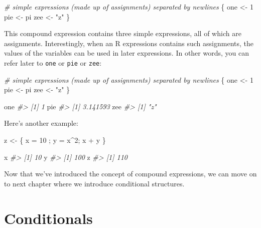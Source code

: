 \documentclass[
]{book}
\newenvironment{Shaded}{\begin{snugshade}}{\end{snugshade}}
\newcommand{\CommentTok}[1]{\textcolor[rgb]{0.56,0.35,0.01}{\textit{#1}}}
\newcommand{\DecValTok}[1]{\textcolor[rgb]{0.00,0.00,0.81}{#1}}
\newcommand{\NormalTok}[1]{#1}
\newcommand{\OtherTok}[1]{\textcolor[rgb]{0.56,0.35,0.01}{#1}}
\newcommand{\SpecialCharTok}[1]{\textcolor[rgb]{0.00,0.00,0.00}{#1}}
\newcommand{\StringTok}[1]{\textcolor[rgb]{0.31,0.60,0.02}{#1}}
\begin{document}
\begin{Shaded}
\begin{Highlighting}[]
\CommentTok{\# simple expressions (made up of assignments) separated by newlines}
\NormalTok{\{}
\NormalTok{  one }\OtherTok{\textless{}{-}} \DecValTok{1}
\NormalTok{  pie }\OtherTok{\textless{}{-}}\NormalTok{ pi}
\NormalTok{  zee }\OtherTok{\textless{}{-}} \StringTok{"z"}
\NormalTok{\}}
\end{Highlighting}
\end{Shaded}

This compound expression contains three simple expressions, all of which are
assignments. Interestingly, when an R expressions contains such assignments, the
values of the variables can be used in later expressions. In other words, you
can refer later to \texttt{one} or \texttt{pie} or \texttt{zee}:

\begin{Shaded}
\begin{Highlighting}[]
\CommentTok{\# simple expressions (made up of assignments) separated by newlines}
\NormalTok{\{}
\NormalTok{  one }\OtherTok{\textless{}{-}} \DecValTok{1}
\NormalTok{  pie }\OtherTok{\textless{}{-}}\NormalTok{ pi}
\NormalTok{  zee }\OtherTok{\textless{}{-}} \StringTok{"z"}
\NormalTok{\}}

\NormalTok{one}
\CommentTok{\#\textgreater{} [1] 1}
\NormalTok{pie}
\CommentTok{\#\textgreater{} [1] 3.141593}
\NormalTok{zee}
\CommentTok{\#\textgreater{} [1] "z"}
\end{Highlighting}
\end{Shaded}

Here's another example:

\begin{Shaded}
\begin{Highlighting}[]
\NormalTok{z }\OtherTok{\textless{}{-}}\NormalTok{ \{ x }\OtherTok{=} \DecValTok{10}\NormalTok{ ; y }\OtherTok{=}\NormalTok{ x}\SpecialCharTok{\^{}}\DecValTok{2}\NormalTok{; x }\SpecialCharTok{+}\NormalTok{ y \}}

\NormalTok{x}
\CommentTok{\#\textgreater{} [1] 10}
\NormalTok{y}
\CommentTok{\#\textgreater{} [1] 100}
\NormalTok{z}
\CommentTok{\#\textgreater{} [1] 110}
\end{Highlighting}
\end{Shaded}

Now that we've introduced the concept of compound expressions, we can move on
to next chapter where we introduce conditional structures.

\hypertarget{conditionals}{%
\chapter{Conditionals}\label{conditionals}}
\end{document}

